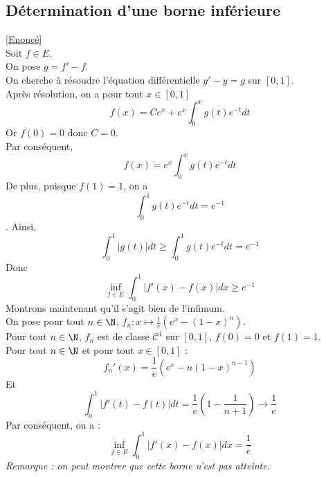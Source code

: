 \documentclass{book}
\begin{document}
	\subsection{Détermination d'une borne inférieure}\label{sec:determination-dune-borne-inferieure}
		\textcolor{blue}{\hyperref[Détermination d'une borne inférieure]{[Enoncé]}}\\
		Soit $f\in E$.\\
		On pose $g=f'-f$.\\
		On cherche à résoudre l'équation différentielle $y'-y=g$ sur $[0,1]$.\\
		Après résolution, on a pour tout $x\in[0,1]$
		\[f(x)=Ce^x+e^x\int_{0}^{x}g(t)e^{-t}dt\]
		Or $f(0)=0$ donc $C=0$.\\
		Par conséquent, \[f(x)=e^x\int_{0}^{x}g(t)e^{-t}dt\]
		De plus, puisque $f(1)=1$, on a \[\int_{0}^{1}g(t)e^{-t}dt=e^{-1}\].
		Ainsi,
		\[\int_{0}^{1}|g(t)|dt\geq \int_{0}^{1}g(t)e^{-t}dt=e^{-1}\]
		Donc 
		\[\inf_{f\in E}\int_0^1|f'(x)-f(x)|dx\geq e^{-1}\]
		Montrons maintenant qu'il s'agit bien de l'infimum.\\
		On pose pour tout $n\in\N$, $f_n:x\mapsto \frac{1}{e}\left(e^x-(1-x)^n\right)$.\\
		Pour tout $n\in\N$, $f_n$ est de classe $\mathcal{C}^1$ sur $[0,1]$, $f(0)=0$ et $f(1)=1$.\\
		Pour tout $n\in\N$ et pour tout $x\in[0,1]$ :
		\[f_n'(x)=\frac{1}{e}\left(e^x-n(1-x)^{n-1}\right)\]
		Et \[\int_{0}^{1}|f'(t)-f(t)|dt=\frac{1}{e}\left(1-\frac{1}{n+1}\right)\longrightarrow \frac{1}{e}\]
		Par conséquent, on a :
		\[\inf_{f\in E}\int_0^1|f'(x)-f(x)|dx=\frac{1}{e}\]
		\textit{Remarque : on peut montrer que cette borne n'est pas atteinte.}
\end{document}
